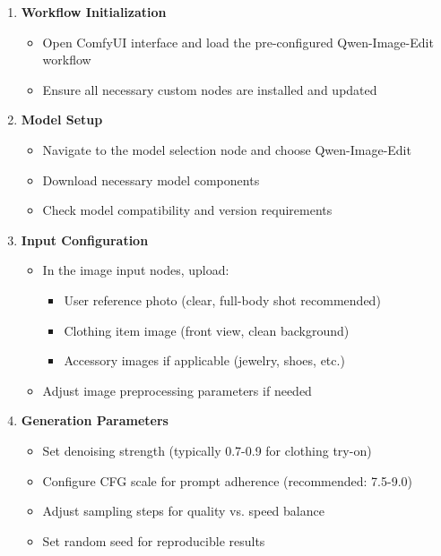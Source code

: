 \begin{enumerate}
    \item \textbf{Workflow Initialization}
    \begin{itemize}
        \item Open ComfyUI interface and load the pre-configured Qwen-Image-Edit workflow
        \item Ensure all necessary custom nodes are installed and updated
    \end{itemize}
    
    \item \textbf{Model Setup}
    \begin{itemize}
        \item Navigate to the model selection node and choose Qwen-Image-Edit
        \item Download necessary model components
        \item Check model compatibility and version requirements
    \end{itemize}
    
    \item \textbf{Input Configuration}
    \begin{itemize}
        \item In the image input nodes, upload:
        \begin{itemize}
            \item User reference photo (clear, full-body shot recommended)
            \item Clothing item image (front view, clean background)
            \item Accessory images if applicable (jewelry, shoes, etc.)
        \end{itemize}
        \item Adjust image preprocessing parameters if needed
    \end{itemize}
    
    \item \textbf{Generation Parameters}
    \begin{itemize}
        \item Set denoising strength (typically 0.7-0.9 for clothing try-on)
        \item Configure CFG scale for prompt adherence (recommended: 7.5-9.0)
        \item Adjust sampling steps for quality vs. speed balance
        \item Set random seed for reproducible results
    \end{itemize}
    

\end{enumerate}
